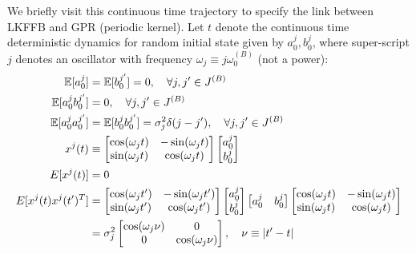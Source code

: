 We briefly visit this continuous time trajectory to specify the link between LKFFB and GPR (periodic kernel). Let $t$ denote the continuous time deterministic dynamics for random initial state given by $a^j_0, b^j_0$, where super-script $j$ denotes an oscillator with frequency $\omega_j \equiv j \omega_0^{(B)}$ (not a power):
\begin{align}
\ex{a^j_0} &=\ex{b^{j'}_0} = 0, \quad \forall j, j' \in J^{(B)} \\
\ex{a^j_0 b^{j'}_0} &= 0, \quad \forall j, j' \in J^{(B)}\\
\ex{a^j_0 a^{j'}_0} &= \ex{b^j_0 b^{j'}_0} = \sigma_j^2\delta(j-j'), \quad \forall j, j' \in J^{(B)} \\
x^j(t) &  \equiv \begin{bmatrix} \cos(\omega_j t) & -\sin(\omega_j t) \\ \sin(\omega_j t) & \cos(\omega_j t) \\ \end{bmatrix} \begin{bmatrix} a^j_0 \\ b^j_0 \\ \end{bmatrix} \\
E[x^j(t)]&= 0 \\%
E[x^j(t) x^j(t'){}^T]&= \begin{bmatrix} \cos(\omega_j t') & -\sin(\omega_j t') \\ \sin(\omega_jt') & \cos(\omega_jt') \\ \end{bmatrix} \begin{bmatrix} a^j_0 \\ b^j_0 \\ \end{bmatrix} \begin{bmatrix} a^j_0 & b^j_0 \\ \end{bmatrix} \begin{bmatrix} \cos(\omega_j t) & -\sin(\omega_j t) \\ \sin(\omega_j t) & \cos(\omega_j t) \\ \end{bmatrix} \\ 
&=\sigma_j^2 \begin{bmatrix} 
\cos(\omega_j\nu) & 0 \\ 
0 & \cos(\omega_j\nu)  \\
\end{bmatrix}, \quad \nu \equiv |t'-t| \label{eqn:cov_circle}
\end{align}
